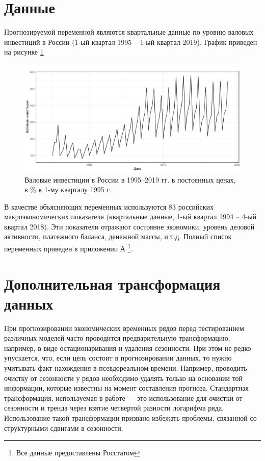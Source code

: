 \section{Данные}
Прогнозируемой переменной являются квартальные данные по уровню валовых инвестиций в России (1-ый квартал 1995 -- 1-ый квартал 2019). График приведен на рисунке \ref{fig:level}

\begin{figure}[hp]
    \centering
    \includegraphics[width = \textwidth]{level_plot.pdf}
    \caption{Валовые инвестиции в России в 1995--2019 гг. в постоянных ценах, в \% к 1-му кварталу 1995 г.}
    \label{fig:level}
\end{figure}

В качестве объясняющих переменных используются 83 российских макроэкономических показателя (квартальные данные,  1-ый квартал 1994 -- 4-ый квартал 2018). Эти показатели отражают состояние экономики, уровень деловой активности, платежного баланса, денежной массы, и т.д. Полный список переменных приведен в приложении А \footnote{Все данные предоставлены Росстатом}.

\section{Дополнительная трансформация данных}
При прогнозировании экономических временных рядов перед тестированием различных моделей часто проводится предварительную трансформацию, например, в виде остационаривания и удаления сезонности. При этом не редко упускается, что, если цель состоит в прогнозировании данных, то нужно учитывать факт нахождения в псевдореальном времени. Например, проводить очистку от сезонности у рядов необходимо удалять только на основании той информации, которые известны на момент составления прогноза. Стандартная трансформация, используемая в работе --- это использование для очистки от сезонности и тренда через взятие четвертой разности логарифма ряда. Использование такой трансформации призвано избежать проблемы, связанной со структурными сдвигами в сезонности.

